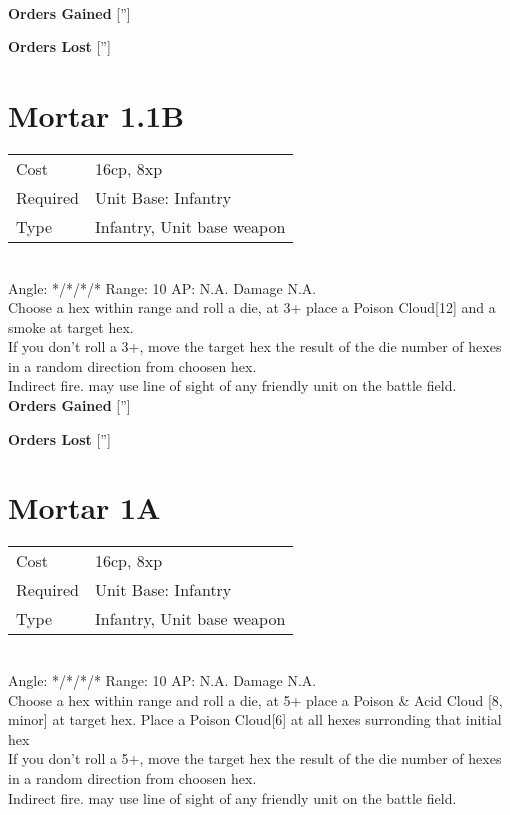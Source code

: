 \ \\

{\bf Orders Gained}
['']

{\bf Orders Lost}
['']
\section{ Mortar 1.1B }

\begin{tabular}{ll}
    Cost & 16cp, 8xp \\
    Required & Unit Base: Infantry\\
    Type & Infantry, Unit base weapon\\
\end{tabular}
\ \\
\indent Angle: */*/*/* Range: 10  AP: N.A. Damage N.A. \\
Choose a hex within range and roll a die, at 3+ place a Poison Cloud[12] and a smoke at target hex. \\ If you don't roll a 3+, move the target hex the result of the die number of hexes in a random direction from choosen hex.  \\ Indirect fire. may use line of sight of any friendly unit on the battle field.
\ \\

{\bf Orders Gained}
['']

{\bf Orders Lost}
['']
\section{ Mortar 1A }

\begin{tabular}{ll}
    Cost & 16cp, 8xp \\
    Required & Unit Base: Infantry\\
    Type & Infantry, Unit base weapon\\
\end{tabular}
\ \\
\indent Angle: */*/*/* Range: 10  AP: N.A. Damage N.A. \\
Choose a hex within range and roll a die, at 5+ place a Poison \& Acid Cloud [8, minor] at target hex. Place a Poison Cloud[6]  at all hexes surronding that initial hex\\ If you don't roll a 5+, move the target hex the result of the die number of hexes in a random direction from choosen hex.  \\ Indirect fire. may use line of sight of any friendly unit on the battle field.
\ \\

